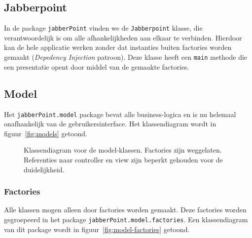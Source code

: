 \documentclass[a4paper]{article}
\newcommand{\code}[1]{\lstinline[columns=fixed]{#1}}
\begin{document}
	\subsection{Jabberpoint}
		In de package \code{jabberPoint} vinden we de \code{Jabberpoint} klasse, die verantwoordelijk is om alle afhankelijkheden aan elkaar te verbinden.
		Hierdoor kan de hele applicatie werken zonder dat instanties buiten factories worden gemaakt (\textit{Depedency Injection} patroon).
		Deze klasse heeft een \code{main} methode die een presentatie opent door middel van de gemaakte factories.

	\subsection{Model}
		Het \code{jabberPoint.model} package bevat alle business-logica en is nu helemaal onafhankelijk van de gebruikersinterface.
		Het klassendiagram wordt in figuur~\ref{fig:models} getoond.

		\begin{figure}[!htb]
		 \caption{
			Klassendiagram voor de model-klassen.\label{fig:model}
			Factories zijn weggelaten.
			Referenties naar controller en view zijn beperkt gehouden voor de duidelijkheid.
		 }
		\end{figure}

		\subsubsection{Factories}
			Alle klassen mogen alleen door factories worden gemaakt.
			Deze factories worden gegroepeerd in het package \code{jabberPoint.model.factories}.
			Een klassendiagram van dit package wordt in figuur~\ref{fig:model-factories} getoond.
\end{document}
